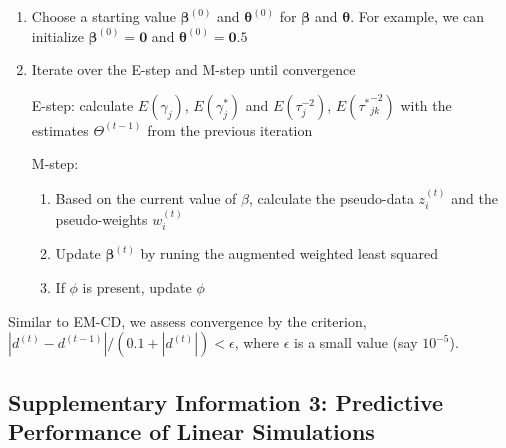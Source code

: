 \documentclass[
]{article}
\providecommand{\tightlist}{%
  \setlength{\itemsep}{0pt}\setlength{\parskip}{0pt}}
\begin{document}
\begin{enumerate}
\def\labelenumi{\arabic{enumi})}
\item
  Choose a starting value \(\boldsymbol{\beta}^{(0)}\) and
  \(\boldsymbol{\theta}^{(0)}\) for \(\boldsymbol{\beta}\) and
  \(\boldsymbol{\theta}\). For example, we can initialize
  \(\boldsymbol{\beta}^{(0)} = \boldsymbol{0}\) and
  \(\boldsymbol{\theta}^{(0)} = \boldsymbol{0}.5\)
\item
  Iterate over the E-step and M-step until convergence

  E-step: calculate \(E(\gamma_{j})\), \(E(\gamma^*_{j})\) and
  \(E(\tau^{-2}_{j})\), \(E({\tau^*}^{-2}_{jk})\) with the estimates
  \(\Theta^{(t-1)}\) from the previous iteration

  M-step:

  \begin{enumerate}
  \def\labelenumii{\alph{enumii})}
  \tightlist
  \item
    Based on the current value of \(\beta\), calculate the pseudo-data
    \(z_i^{(t)}\) and the pseudo-weights \(w_i^{(t)}\)
  \item
    Update \(\boldsymbol{\beta}^{(t)}\) by runing the augmented weighted
    least squared
  \item
    If \(\phi\) is present, update \(\phi\)
  \end{enumerate}
\end{enumerate}

Similar to EM-CD, we assess convergence by the criterion,
\(|d^{(t)}-d^{(t-1)}|/(0.1+|d^{(t)}|)<\epsilon\), where \(\epsilon\) is
a small value (say \(10^{-5}\)).

\clearpage

\subsection{Supplementary Information 3: Predictive Performance of Linear Simulations}


\end{document}
